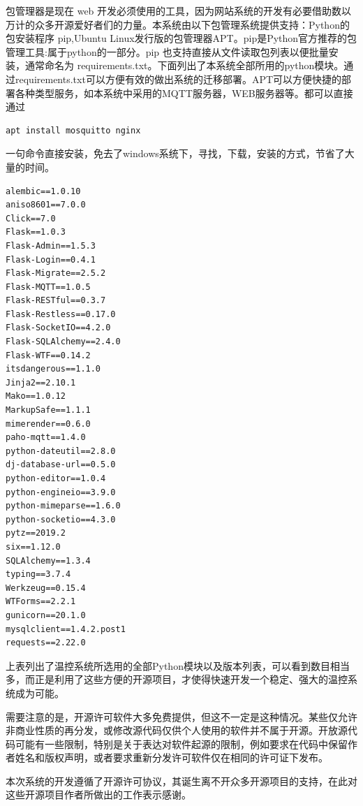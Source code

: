 包管理器是现在 web 开发必须使用的工具，因为网站系统的开发有必要借助数以万计的众多开源爱好者们的力量。本系统由以下包管理系统提供支持：Python的包安装程序 pip,Ubuntu Linux发行版的包管理器APT。pip是Python官方推荐的包管理工具:属于python的一部分。pip 也支持直接从文件读取包列表以便批量安装，通常命名为 requirements.txt。下面列出了本系统全部所用的python模块。通过requirements.txt可以方便有效的做出系统的迁移部署。APT可以方便快捷的部署各种类型服务，如本系统中采用的MQTT服务器，WEB服务器等。都可以直接通过\begin{lstlisting}[language=bash]
apt install mosquitto nginx
\end{lstlisting}一句命令直接安装，免去了windows系统下，寻找，下载，安装的方式，节省了大量的时间。

\begin{lstlisting}[title=温控系统所选用的全部Python模块以及版本列表]
alembic==1.0.10
aniso8601==7.0.0
Click==7.0
Flask==1.0.3
Flask-Admin==1.5.3
Flask-Login==0.4.1
Flask-Migrate==2.5.2
Flask-MQTT==1.0.5
Flask-RESTful==0.3.7
Flask-Restless==0.17.0
Flask-SocketIO==4.2.0
Flask-SQLAlchemy==2.4.0
Flask-WTF==0.14.2
itsdangerous==1.1.0
Jinja2==2.10.1
Mako==1.0.12
MarkupSafe==1.1.1
mimerender==0.6.0
paho-mqtt==1.4.0
python-dateutil==2.8.0
dj-database-url==0.5.0
python-editor==1.0.4
python-engineio==3.9.0
python-mimeparse==1.6.0
python-socketio==4.3.0
pytz==2019.2
six==1.12.0
SQLAlchemy==1.3.4
typing==3.7.4
Werkzeug==0.15.4
WTForms==2.2.1
gunicorn==20.1.0 
mysqlclient==1.4.2.post1
requests==2.22.0
\end{lstlisting}

上表列出了温控系统所选用的全部Python模块以及版本列表，可以看到数目相当多，而正是利用了这些方便的开源项目，才使得快速开发一个稳定、强大的温控系统成为可能。

需要注意的是，开源许可软件大多免费提供，但这不一定是这种情况。某些仅允许非商业性质的再分发，或修改源代码仅供个人使用的软件并不属于开源。开放源代码可能有一些限制，特别是关于表达对软件起源的限制，例如要求在代码中保留作者姓名和版权声明，或者要求重新分发许可软件仅在相同的许可证下发布。

本次系统的开发遵循了开源许可协议，其诞生离不开众多开源项目的支持，在此对这些开源项目作者所做出的工作表示感谢。
